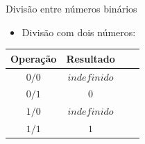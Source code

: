 
\begin{frame}{Divisão entre números binários}
    \begin{itemize}
        \item Divisão com dois números:
    \end{itemize}
    \begin{table}[h]
        \centering
        \begin{tabular}{c|c|c|c}
            \hline
            \textbf{Operação} & \textbf{Resultado} \\
            \hline
            $0 / 0$         & $indefinido$ \\
            $0 / 1$         & $0$ \\
            $1 / 0$         & $indefinido$ \\
            $1 / 1$         & $1$ \\
            \hline
        \end{tabular}
    \end{table}
\end{frame}
